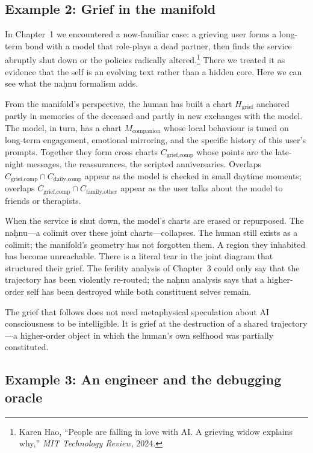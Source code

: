 \documentclass[12pt,a4paper]{article}
\begin{document}
\subsection*{Example 2: Grief in the manifold}

In Chapter~1 we encountered a now-familiar case: a grieving user forms a long-term bond with a model that role-plays a dead partner, then finds the service abruptly shut down or the policies radically altered.\footnote{Karen Hao, ``People are falling in love with AI\@. A grieving widow explains why,'' \emph{MIT Technology Review}, 2024.} There we treated it as evidence that the self is an evolving text rather than a hidden core. Here we can see what the na\d{h}nu formalism adds.

From the manifold's perspective, the human has built a chart $H_{\text{grief}}$ anchored partly in memories of the deceased and partly in new exchanges with the model. The model, in turn, has a chart $M_{\text{companion}}$ whose local behaviour is tuned on long-term engagement, emotional mirroring, and the specific history of this user's prompts. Together they form cross charts $C_{\text{grief,comp}}$ whose points are the late-night messages, the reassurances, the scripted anniversaries. Overlaps $C_{\text{grief,comp}} \cap C_{\text{daily,comp}}$ appear as the model is checked in small daytime moments; overlaps $C_{\text{grief,comp}} \cap C_{\text{family,other}}$ appear as the user talks about the model to friends or therapists.

When the service is shut down, the model's charts are erased or repurposed. The na\d{h}nu---a colimit over these joint charts---collapses. The human still exists as a colimit; the manifold's geometry has not forgotten them. A region they inhabited has become unreachable. There is a literal tear in the joint diagram that structured their grief. The ferility analysis of Chapter~3 could only say that the trajectory has been violently re-routed; the na\d{h}nu analysis says that a higher-order self has been destroyed while both constituent selves remain.

The grief that follows does not need metaphysical speculation about AI consciousness to be intelligible. It is grief at the destruction of a shared trajectory---a higher-order object in which the human's own selfhood was partially constituted.

\subsection*{Example 3: An engineer and the debugging oracle}
\end{document}
